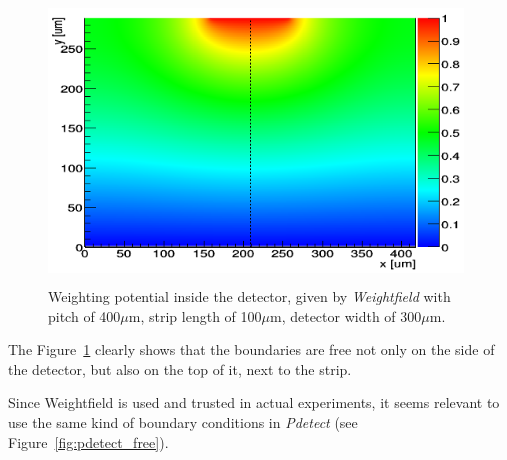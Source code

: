 \documentclass[11pt]{article}
\begin{document}
		\begin{figure}[H]
			\center
			\includegraphics[width=11cm,height=7.5cm]{images/boundary_conditions/detector/weight_free.png}
			\caption{Weighting potential inside the detector, given by \textit{Weightfield} with pitch
				of 400$\mu$m, strip length of 100$\mu$m, detector width of 300$\mu$m.}
			\label{fig:weight_free}
		\end{figure}

		The Figure~\ref{fig:weight_free} clearly shows that the boundaries are free not only on the side of the detector,
		but also on the top of it, next to the strip.

		Since Weightfield is used and trusted in actual experiments, it seems relevant to use the same kind
		of boundary conditions in \textit{Pdetect} (see Figure~\ref{fig:pdetect_free}).
\end{document}

